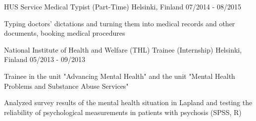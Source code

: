 \begin{cventries}
  \cventry
    {HUS Service} %
    {Medical Typist (Part-Time)} %
    {Helsinki, Finland} %
    {07/2014 - 08/2015} %
    {
      \begin{cvitems}
        \item {Typing doctors' dictations and turning them into medical records and
        other documents, booking medical procedures}
      \end{cvitems}
    }

  \cventry
    {National Institute of Health and Welfare (THL)} %
    {Trainee (Internship)} %
    {Helsinki, Finland} %
    {05/2013 - 09/2013} %
    {
      \begin{cvitems}
        \item {Trainee in the unit "Advancing Mental Health" and the unit
        "Mental Health Problems and Substance Abuse Services"}
        \item {Analyzed survey results of the mental health situation
        in Lapland and testing the reliability of psychological measurements
        in patients with psychosis (SPSS, R)}
      \end{cvitems}
    }

\end{cventries}
